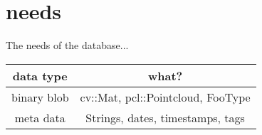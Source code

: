 \section{needs}
The needs of the database...

\begin{tabular}{|c|c|} \hline
data type & what? \\ \hline
binary blob & cv::Mat, pcl::Pointcloud, FooType \\
meta data & Strings, dates, timestamps, tags \\ \hline
\end{tabular} 